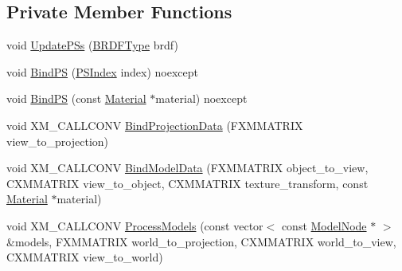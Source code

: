 \subsection*{Private Member Functions}
\begin{DoxyCompactItemize}
\item 
void \hyperlink{classmage_1_1_variable_shading_pass_a4e0a0e7709d99bb94f3263bdf478f484}{Update\+P\+Ss} (\hyperlink{namespacemage_ae7a7a03a7b34d7e2689689bb8295cd38}{B\+R\+D\+F\+Type} brdf)
\item 
void \hyperlink{classmage_1_1_variable_shading_pass_a9352c4b8b435254768c3407550458fb5}{Bind\+PS} (\hyperlink{classmage_1_1_variable_shading_pass_a49519e421ac5be93136d9efdbf075d4a}{P\+S\+Index} index) noexcept
\item 
void \hyperlink{classmage_1_1_variable_shading_pass_a0d7edd2336abc2791f93b180317f154f}{Bind\+PS} (const \hyperlink{structmage_1_1_material}{Material} $\ast$material) noexcept
\item 
void X\+M\+\_\+\+C\+A\+L\+L\+C\+O\+NV \hyperlink{classmage_1_1_variable_shading_pass_af3c6340c01dabc300d5139b490198f07}{Bind\+Projection\+Data} (F\+X\+M\+M\+A\+T\+R\+IX view\+\_\+to\+\_\+projection)
\item 
void X\+M\+\_\+\+C\+A\+L\+L\+C\+O\+NV \hyperlink{classmage_1_1_variable_shading_pass_a9041b2b7695ede893ea5bc6b5b43e98d}{Bind\+Model\+Data} (F\+X\+M\+M\+A\+T\+R\+IX object\+\_\+to\+\_\+view, C\+X\+M\+M\+A\+T\+R\+IX view\+\_\+to\+\_\+object, C\+X\+M\+M\+A\+T\+R\+IX texture\+\_\+transform, const \hyperlink{structmage_1_1_material}{Material} $\ast$material)
\item 
void X\+M\+\_\+\+C\+A\+L\+L\+C\+O\+NV \hyperlink{classmage_1_1_variable_shading_pass_a559c5c05f9e2a9e79f86a8e80e30606d}{Process\+Models} (const vector$<$ const \hyperlink{classmage_1_1_model_node}{Model\+Node} $\ast$ $>$ \&models, F\+X\+M\+M\+A\+T\+R\+IX world\+\_\+to\+\_\+projection, C\+X\+M\+M\+A\+T\+R\+IX world\+\_\+to\+\_\+view, C\+X\+M\+M\+A\+T\+R\+IX view\+\_\+to\+\_\+world)
\end{DoxyCompactItemize}
